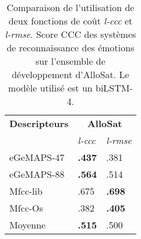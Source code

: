 \begin{table}[htp]
\centering
\begin{tabular}{| l | l l |}
    \hline
    \textbf{Descripteurs} &\multicolumn{2}{c|}{\textbf{AlloSat}} \\
      &\textit{l-ccc}   &\textit{l-rmse}  \\
    \hline
    eGeMAPS-47  &\textbf{.437} &.381       \\
    eGeMAPS-88  &\textbf{.564} &.514       \\
    Mfcc-lib    &.675  &\textbf{.698} \\
    Mfcc-Os     &.382   &\textbf{.405}      \\
    \hline
    Moyenne		& \textbf{.515} & .500\\
    \hline
\end{tabular}
\caption{Comparaison de l'utilisation de deux fonctions de coût \textit{l-ccc} et \textit{l-rmse}. Score CCC des systèmes de reconnaissance des émotions sur l'ensemble de développement d'AlloSat. Le modèle utilisé est un biLSTM-4.}
\label{tab:cccVSrmse}
\end{table}
